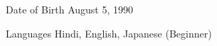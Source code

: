 

\begin{cvskills}

  \cvskill
    {Date of Birth} %
    {August 5, 1990} %

  \cvskill
    {Languages} %
    {Hindi, English, Japanese (Beginner)} %

\end{cvskills}

